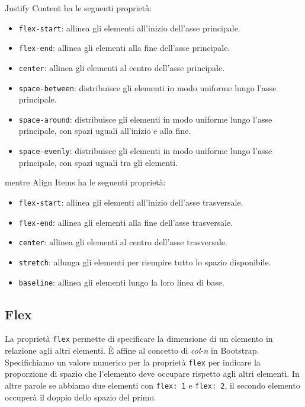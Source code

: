 \documentclass[12pt]{article}
\begin{document}
Justify Content ha le seguenti proprietà:
\begin{itemize}
\item \texttt{flex-start}: allinea gli elementi all'inizio dell'asse principale.
\item \texttt{flex-end}: allinea gli elementi alla fine dell'asse principale.
\item \texttt{center}: allinea gli elementi al centro dell'asse principale.
\item \texttt{space-between}: distribuisce gli elementi in modo uniforme lungo l'asse principale.
\item \texttt{space-around}: distribuisce gli elementi in modo uniforme lungo l'asse principale, 
con spazi uguali all'inizio e alla fine.
\item \texttt{space-evenly}: distribuisce gli elementi in modo uniforme lungo l'asse principale, 
con spazi uguali tra gli elementi.
\end{itemize}

mentre Align Items ha le seguenti proprietà:
\begin{itemize}
\item \texttt{flex-start}: allinea gli elementi all'inizio dell'asse trasversale.
\item \texttt{flex-end}: allinea gli elementi alla fine dell'asse trasversale.
\item \texttt{center}: allinea gli elementi al centro dell'asse trasversale.
\item \texttt{stretch}: allunga gli elementi per riempire tutto lo spazio disponibile.
\item \texttt{baseline}: allinea gli elementi lungo la loro linea di base.
\end{itemize}

\subsection{Flex}
La proprietà \texttt{flex} permette di specificare la dimensione di un elemento in relazione
agli altri elementi. È affine al concetto di \textit{col-n} in Bootstrap.
Specifichiamo un valore numerico per la proprietà \texttt{flex} per indicare la proporzione
di spazio che l'elemento deve occupare rispetto agli altri elementi.
In altre parole se abbiamo due elementi con \texttt{flex: 1} e \texttt{flex: 2}, il secondo
elemento occuperà il doppio dello spazio del primo.
\end{document}
